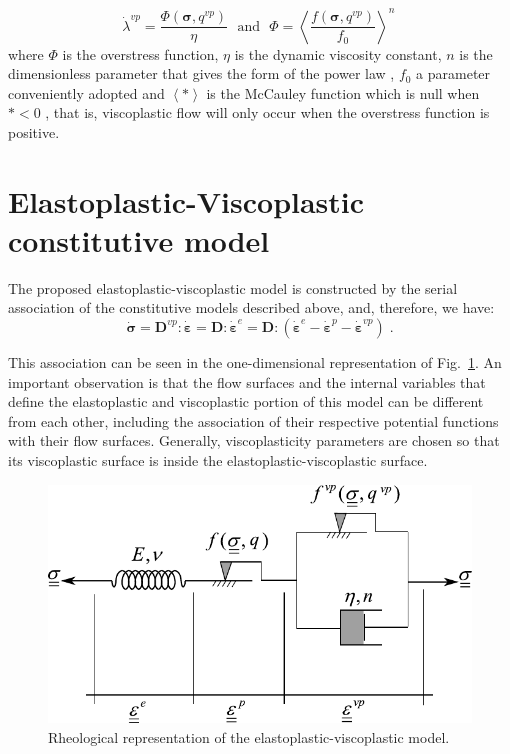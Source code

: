 \documentclass[Journal,letterpaper]{ascelike-new}
\newcommand{\Dsdee}{\boldsymbol{D}}
\newcommand{\Dsdev}{\boldsymbol{D}^{vp}}
\newcommand{\dstrain}{\boldsymbol{\dot{\varepsilon}}}
\newcommand{\dstraine}{\boldsymbol{\dot{\varepsilon}}^{e}}
\newcommand{\dstrainp}{\boldsymbol{\dot{\varepsilon}}^{p}}
\newcommand{\dstrainv}{\boldsymbol{\dot{\varepsilon}}^{vp}}
\newcommand{\dstress}{\boldsymbol{\dot{\sigma}}}
\newcommand{\stress}{\boldsymbol{\sigma}}
\begin{document}
\begin{equation} \label{eq_perzyna_model}
	\dot \lambda^{vp} = \dfrac{\Phi(\stress,q^{vp})}{\eta}~~~\text{and}~~~\Phi = \left\langle  \dfrac{f(\stress,q^{vp})}{f_0} \right\rangle^n \,
\end{equation} where $\Phi$ is the overstress function, $\eta$ is the dynamic viscosity constant, $n$ is the dimensionless parameter that gives the form of the power law , $f_0$ a parameter conveniently adopted and $\left\langle * \right\rangle$ is the McCauley function which is null when $* <0$ , that is, viscoplastic flow will only occur when the overstress function is positive.

\section{Elastoplastic-Viscoplastic constitutive model}

The proposed elastoplastic-viscoplastic model is constructed by the serial association of the constitutive models described above, and, therefore, we have:
\begin{equation} \label{eq_constitutive_relationship_epvp}
	\dstress = \Dsdev : \dstrain = \Dsdee : \dstraine = \Dsdee : (\dstraine - \dstrainp - \dstrainv)\;.
\end{equation}

This association can be seen in the one-dimensional representation of Fig.~\ref{reological_scheme}. An important observation is that the flow surfaces and the internal variables that define the elastoplastic and viscoplastic portion of this model can be different from each other, including the association of their respective potential functions with their flow surfaces. Generally, viscoplasticity parameters are chosen so that its viscoplastic surface is inside the elastoplastic-viscoplastic surface.

\begin{figure}
	\centering
	\includegraphics[scale=1]{reological_scheme.pdf}
	\caption{Rheological representation of the elastoplastic-viscoplastic model.}
	\label{reological_scheme}
\end{figure}
\end{document}
